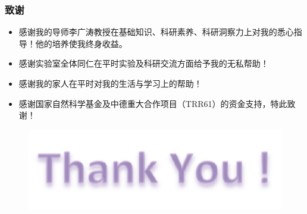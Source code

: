 \documentclass{beamer}
\begin{document}
\begin{frame}
  \frametitle{致谢}
  \begin{itemize}
    \item
    感谢我的导师李广涛教授在基础知识、科研素养、科研洞察力上对我的悉心指导！他的培养使我终身收益。
    \item
    感谢实验室全体同仁在平时实验及科研交流方面给予我的无私帮助！
    \item
    感谢我的家人在平时对我的生活与学习上的帮助！
    \item
    感谢国家自然科学基金及中德重大合作项目（TRR61）的资金支持，特此致谢！
  \end{itemize}
\end{frame}

\begin{frame}
  \begin{figure}[h]
    \centering
    \includegraphics[width=0.5\linewidth]{figures/thankyou.png}
  \end{figure}
\end{frame}
\end{document}
